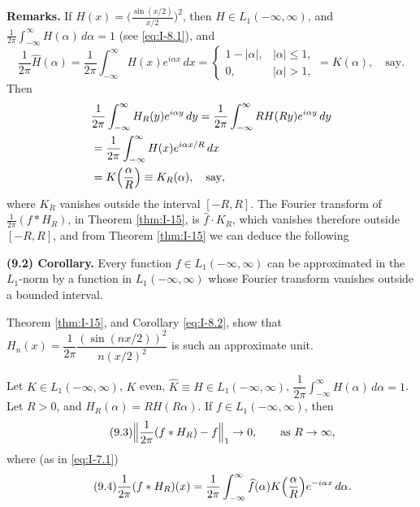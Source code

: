 \noindent\textbf{Remarks.}
If $H(x)=\bigl(\frac{\sin(x/2)}{x/2}\bigr)^2$, then $H\in L_1(-\infty,\infty)$, and $\frac{1}{2\pi}\int_{-\infty}^{\infty}H(\alpha)\,d\alpha=1$ (see \eqref{eq:I-8.1}), and
\begin{equation*}
\frac{1}{2\pi}\widehat H(\alpha)
=\frac{1}{2\pi}\int_{-\infty}^{\infty}H(x)e^{i\alpha x}\,dx
=
\begin{cases}
1-|\alpha|,&|\alpha|\le 1,\\
0,&|\alpha|>1,
\end{cases}
=K(\alpha),\quad\text{say}.
\end{equation*}
Then
\begin{equation*}
\begin{aligned}
&\frac{1}{2\pi}\int_{-\infty}^{\infty}H_R(y)e^{i\alpha y}\,dy = \frac{1}{2\pi}\int_{-\infty}^{\infty}RH(Ry)e^{i\alpha y}\,dy\\
&= \frac{1}{2\pi}\int_{-\infty}^{\infty}H(x)e^{i\alpha x/R}\,dx\\
&= K\Bigl(\frac{\alpha}{R}\Bigr)\equiv K_R(\alpha),\quad\text{say},
\end{aligned}
\end{equation*}
where $K_R$ vanishes outside the interval $[-R,R]$. The Fourier transform of $\frac{1}{2\pi}(f*H_R)$, in Theorem \ref{thm:I-15}, is $\widehat f\cdot K_R$, which vanishes therefore outside $[-R,R]$, and from Theorem \ref{thm:I-15} we can deduce the following

\noindent\textbf{(9.2) Corollary.}
Every function $f\in L_1(-\infty,\infty)$ can be approximated in the $L_1$-norm by a function in $L_1(-\infty,\infty)$ whose Fourier transform vanishes outside a bounded interval.

Theorem \ref{thm:I-15}, and Corollary \eqref{eq:I-8.2}, show that $H_n(x)=\dfrac{1}{2\pi}\dfrac{(\sin(nx/2))^2}{n(x/2)^2}$ is such an approximate unit.

\begin{theorem}\label{thm:I-16}
Let $K\in L_1(-\infty,\infty)$, $K$ even, $\hat K\equiv H\in L_1(-\infty,\infty)$, $\dfrac{1}{2\pi}\int_{-\infty}^{\infty}H(\alpha)\,d\alpha=1$. Let $R>0$, and $H_R(\alpha)=RH(R\alpha)$. If $f\in L_1(-\infty,\infty)$, then
\begin{equation}\label{eq:I-9.3}\tag{9.3}
\Bigl\|\frac{1}{2\pi}(f*H_R)-f\Bigr\|_1\to 0,\qquad\text{as }R\to\infty,
\end{equation}
where (as in \eqref{eq:I-7.1})
\begin{equation}\label{eq:I-9.4}\tag{9.4}
\frac{1}{2\pi}(f*H_R)(x)=\frac{1}{2\pi}\int_{-\infty}^{\infty}\widehat f(\alpha)K\Bigl(\frac{\alpha}{R}\Bigr)e^{-i\alpha x}\,d\alpha.
\end{equation}
\end{theorem}


